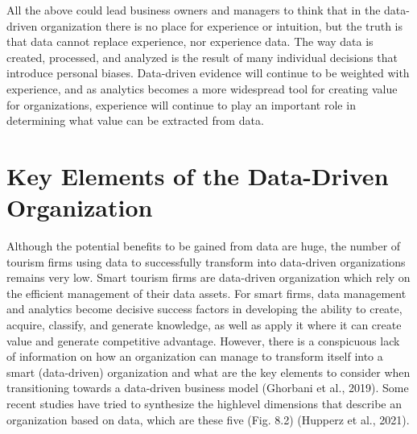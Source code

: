 \documentclass[
  letterpaper,
  DIV=11,
  numbers=noendperiod]{scrreprt}
\begin{document}
All the above could lead business owners and managers to think that in
the data-driven organization there is no place for experience or
intuition, but the truth is that data cannot replace experience, nor
experience data. The way data is created, processed, and analyzed is the
result of many individual decisions that introduce personal biases.
Data-driven evidence will continue to be weighted with experience, and
as analytics becomes a more widespread tool for creating value for
organizations, experience will continue to play an important role in
determining what value can be extracted from data.

\hypertarget{key-elements-of-the-data-driven-organization}{%
\section{Key Elements of the Data-Driven
Organization}\label{key-elements-of-the-data-driven-organization}}

Although the potential benefits to be gained from data are huge, the
number of tourism firms using data to successfully transform into
data-driven organizations remains very low. Smart tourism firms are
data-driven organization which rely on the efficient management of their
data assets. For smart firms, data management and analytics become
decisive success factors in developing the ability to create, acquire,
classify, and generate knowledge, as well as apply it where it can
create value and generate competitive advantage. However, there is a
conspicuous lack of information on how an organization can manage to
transform itself into a smart (data-driven) organization and what are
the key elements to consider when transitioning towards a data-driven
business model (Ghorbani et al., 2019). Some recent studies have tried
to synthesize the highlevel dimensions that describe an organization
based on data, which are these five (Fig. 8.2) (Hupperz et al., 2021).
\end{document}
